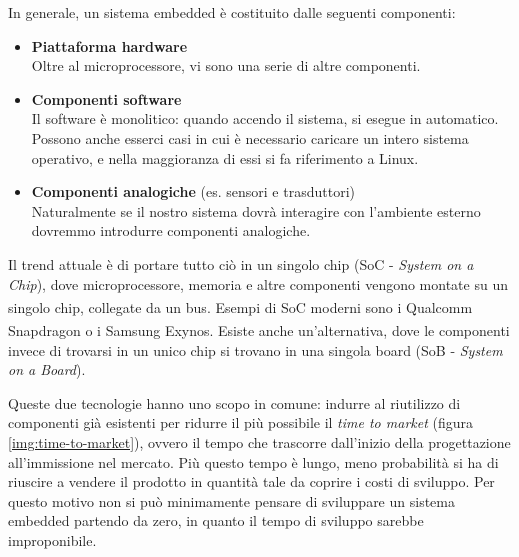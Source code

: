 \documentclass[10pt,a4paper,oneside]{scrbook}
\begin{document}
\smallskip
In generale, un sistema embedded è costituito dalle seguenti componenti:
\begin{itemize}
	\item \textbf{Piattaforma hardware}\\
    Oltre al microprocessore, vi sono una serie di altre componenti.
	\item \textbf{Componenti software}\\
    Il software è monolitico: quando accendo il sistema, si esegue in automatico.
    Possono anche esserci casi in cui è necessario caricare un intero sistema operativo, e nella maggioranza di essi si fa riferimento a Linux.
	\item \textbf{Componenti analogiche} (es. sensori e trasduttori)\\
    Naturalmente se il nostro sistema dovrà interagire con l'ambiente esterno dovremmo introdurre componenti analogiche.
\end{itemize}
Il trend attuale è di portare tutto ciò in un singolo chip (SoC - \textit{System on a Chip}), dove microprocessore,
memoria e altre componenti vengono montate su un singolo chip, collegate da un bus. Esempi di SoC moderni sono i
Qualcomm\textsuperscript{\textregistered} Snapdragon o i Samsung\textsuperscript{\textregistered} Exynos.
Esiste anche un'alternativa, dove le componenti invece di trovarsi in un unico chip si trovano in una singola
board (SoB - \textit{System on a Board}).

Queste due tecnologie hanno uno scopo in comune: indurre al riutilizzo di componenti già esistenti per
ridurre il più possibile il \textit{time to market} (figura \ref{img:time-to-market}), ovvero il tempo che trascorre
dall'inizio della progettazione all'immissione nel mercato. Più questo tempo è lungo, meno probabilità si ha di riuscire a vendere
il prodotto in quantità tale da coprire i costi di sviluppo.
Per questo motivo non si può minimamente pensare di sviluppare un sistema embedded partendo da zero, in quanto il tempo di sviluppo
sarebbe improponibile.
\end{document}

